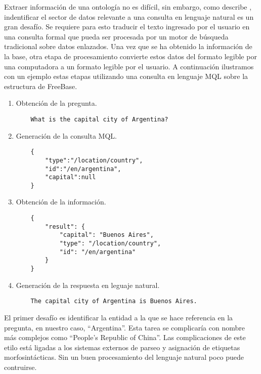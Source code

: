 Extraer información de una ontología no es difícil, sin embargo, como describe \citet{ungerQALD}, indentificar el sector de datos relevante a una consulta en lenguaje natural es un gran desafío. Se requiere para esto traducir el texto ingresado por el usuario en una consulta formal que pueda ser procesada por un motor de búsqueda tradicional sobre datos enlazados. Una vez que se ha obtenido la información de la base, otra etapa de procesamiento convierte estos datos del formato legible por una computadora a un formato legible por el usuario. A continuación ilustramos con un ejemplo estas etapas utilizando una consulta en lenguaje MQL sobre la estructura de FreeBase.

\begin{example}\label{QALD-etapas}\hfill
    \begin{enumerate}
        \item Obtención de la pregunta.
            \begin{lstlisting}
    What is the capital city of Argentina?
            \end{lstlisting}
        \item Generación de la consulta MQL.
            \begin{lstlisting}
    {
        "type":"/location/country",
        "id":"/en/argentina",
        "capital":null
    }
            \end{lstlisting}
        \item Obtención de la información.
            \begin{lstlisting}
    {
        "result": {
            "capital": "Buenos Aires",
            "type": "/location/country",
            "id": "/en/argentina"
        }
    }
            \end{lstlisting}
        \item Generación de la respuesta en leguaje natural.
            \begin{lstlisting}
    The capital city of Argentina is Buenos Aires.
            \end{lstlisting}
    \end{enumerate}
\end{example}

El primer desafío es identificar la entidad a la que se hace referencia en la pregunta, en nuestro caso, ``Argentina''. Esta tarea se complicaría con nombre más complejos como ``People's Republic of China''. Las complicaciones de este etilo está ligadas a los sistemas externos de parseo y asignación de etiquetas morfosintácticas. Sin un buen procesamiento del lenguaje natural poco puede contruirse.

